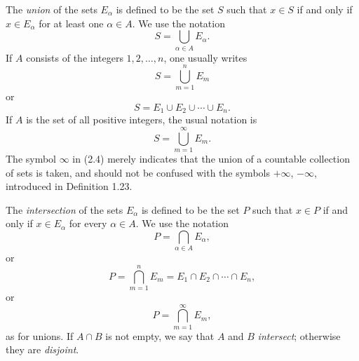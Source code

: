 The \emph{union} of the sets $E_\alpha$ is defined to be the set $S$ such that
$x \in S$ if and only if $x \in E_\alpha$ for at least one $\alpha \in A$. We
use the notation
\begin{equation}
  S = \bigcup_{\alpha \in A} E_\alpha. \tag{2.1}
\end{equation}
If $A$ consists of the integers $1,2,\dots,n$, one usually writes
\begin{equation}
  S = \bigcup_{m=1}^{n} E_m \tag{2.2}
\end{equation}
or
\begin{equation}
  S = E_1 \cup E_2 \cup \cdots \cup E_n. \tag{2.3}
\end{equation}
If $A$ is the set of all positive integers, the usual notation is
\begin{equation}
  S = \bigcup_{m=1}^{\infty} E_m. \tag{2.4}
\end{equation}
The symbol $\infty$ in (2.4) merely indicates that the union of a countable
collection of sets is taken, and should not be confused with the symbols
$+\infty$, $-\infty$, introduced in Definition 1.23.

The \emph{intersection} of the sets $E_\alpha$ is defined to be the set $P$
such that $x \in P$ if and only if $x \in E_\alpha$ for every $\alpha \in A$.
We use the notation
\begin{equation}
  P = \bigcap_{\alpha \in A} E_\alpha, \tag{2.5}
\end{equation}
or
\begin{equation}
  P = \bigcap_{m=1}^{n} E_m = E_1 \cap E_2 \cap \cdots \cap E_n, \tag{2.6}
\end{equation}
or
\begin{equation}
  P = \bigcap_{m=1}^{\infty} E_m, \tag{2.7}
\end{equation}
as for unions. If $A \cap B$ is not empty, we say that $A$ and $B$
\emph{intersect}; otherwise they are \emph{disjoint}.

